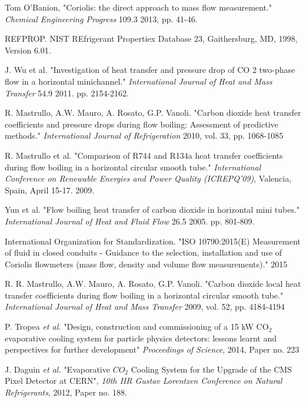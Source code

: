 \documentclass{report}
\begin{document}
\begin{itemize}
\begin{thebibliography}{9}
Tom O'Banion,  "Coriolis: the direct approach to mass flow measurement." \textit{Chemical Engineering Progress} 109.3 2013, pp. 41-46.

REFPROP. NIST REfrigerant Propertiex Database 23, Gaithersburg, MD, 1998, Version 6.01.

J. Wu et al. "Investigation of heat transfer and pressure drop of CO 2 two-phase flow in a horizontal minichannel." \textit{International Journal of Heat and Mass Transfer} 54.9 2011. pp. 2154-2162.

R. Mastrullo, A.W. Mauro, A. Rosato, G.P. Vanoli. "Carbon dioxide heat transfer coefficients and pressure drops during flow boiling: Assessment of predictive methods." \textit{International Journal of Refrigeration} 2010, vol. 33, pp. 1068-1085

R. Mastrullo et al. "Comparison of R744 and R134a heat transfer coefficients during flow boiling in a horizontal circular smooth tube." \textit{International Conference on Renewable Energies and Power Quality (ICREPQ’09)}, Valencia, Spain, April 15-17. 2009.

Yun et al. "Flow boiling heat transfer of carbon dioxide in horizontal mini tubes." \textit{International Journal of Heat and Fluid Flow} 26.5 2005. pp. 801-809.

International Organization for Standardization. "ISO 10790:2015(E) Measurement of fluid in closed conduits - Guidance to the selection, installation and use of Coriolis flowmeters (mass flow, density and volume flow measurements)." 2015

R. R. Mastrullo, A.W. Mauro, A. Rosato, G.P. Vanoli. "Carbon dioxide local heat transfer coefficients during flow boiling in a horizontal circular smooth tube." \textit{International Journal of Heat and Mass Transfer} 2009, vol. 52, pp. 4184-4194

P. Tropea \textit{et al.} "Design, construction and commissioning of a 15 kW CO$_2$ evaporative cooling system for particle physics detectors: lessons learnt and perspectives for further development" \textit{Proceedings of Science}, 2014, Paper no. 223

J. Daguin \textit{et al.} "Evaporative $CO_2$ Cooling System for the Upgrade of the CMS Pixel Detector at CERN", \textit{10th IIR Gustav Lorentzen Conference on Natural Refrigerants}, 2012, Paper no. 188.


\end{thebibliography}
\end{itemize}
\end{document}

